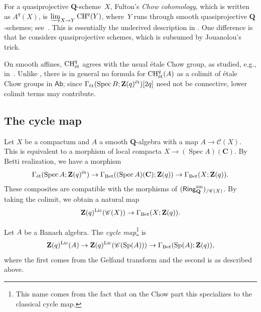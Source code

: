 \documentclass[11pt,a4paper]{amsart}
\renewcommand{\injlim}{\varinjlim}
\newcommand{\cref}[1]{\zcref{#1}}
\numberwithin{equation}{section}
\theoremstyle{plain}
\theoremstyle{definition}
\theoremstyle{remark}
\newcommand{\ZZ}{\mathbf{Z}}
\newcommand{\QQ}{\mathbf{Q}}
\newcommand{\CC}{\mathbf{C}}
\newcommand{\Lic}{\textnormal{Lic}}
\newcommand{\et}{\textnormal{ét}}
\newcommand{\sm}{\textnormal{sm}}
\newcommand{\Bet}{\textnormal{Bet}}
\newcommand{\CH}{\operatorname{CH}}
\newcommand{\Spec}{\operatorname{Spec}}
\newcommand{\Sp}{\operatorname{Sp}}
\newcommand{\Cat}[1]{\mathsf{#1}}
\newcommand{\Cls}[1]{\mathscr{#1}}
\begin{document}
\begin{remark}\label{xxox4h}
  For a quasiprojective \(\QQ\)-scheme~\(X\),
  Fulton’s \emph{Chow cohomology},
  which is written as \(A^{q}(X)\),
  is
  \(\injlim_{X\to Y}\CH^q(Y)\),
  where~\(Y\) runs through smooth quasiprojective \(\QQ\)-schemes;
  see~\cite[Section~3.1]{Fulton75}.
  This is essentially the underived description in \cref{top-lan}.
  One difference is that
  he considers quasiprojective schemes,
  which is subsumed by Jouanolou’s trick.
\end{remark}

On smooth affines,
\(\CH_{\et}^{q}\)
agrees with the usual étale Chow group,
as studied, e.g., in~\cite{RosenschonSrinivas16}.
Unlike \cref{top-lan}, there is in general no formula for
\(\CH^q_{\et}(A)\) as a colimit of étale Chow groups in \(\Cat{Ab}\);
since
\(\Gamma_{\et}(\Spec B;\ZZ(q)^{\et})[2q]\) need not be connective,
lower colimit terms may contribute.

\subsection{The cycle map}\label{ss:betti}

Let \(X\) be a compactum
and \(A\) a smooth \(\QQ\)-algebra
with a map \(A\to\Cls{C}(X)\).
This is equivalent to
a morphism of local compacta
\(X\to (\Spec A)(\CC)\).
By Betti realization,
we have a morphism
\begin{equation*}
  \Gamma_{\et}(\Spec A;\ZZ(q)^{\et})
  \to
  \Gamma_{\Bet}((\Spec A)(\CC);\ZZ(q))
  \to
  \Gamma_{\Bet}(X;\ZZ(q)).
\end{equation*}
These composites are compatible with the morphisms of
\((\Cat{Ring}_{\QQ}^{\sm})_{/\Cls{C}(X)}\).
By taking the colimit,
we obtain a natural map
\begin{equation*}
  \ZZ(q)^{\Lic}(\Cls{C}(X))
  \to
  \Gamma_{\Bet}(X;\ZZ(q)).
\end{equation*}

\begin{definition}\label{x25gqw}
  Let \(A\) be a Banach algebra.
  The \emph{cycle map}\footnote{This name comes from the fact that
    on the Chow part this specializes
    to the classical cycle map.
  } is
  \begin{equation*}
    \ZZ(q)^{\Lic}(A)
    \to
    \ZZ(q)^{\Lic}(\Cls{C}(\Sp(A)))
    \to
    \Gamma_{\Bet}(\Sp(A);\ZZ(q)),
  \end{equation*}
  where the first comes from the Gelfand transform
  and the second is as described above.
\end{definition}
\end{document}
